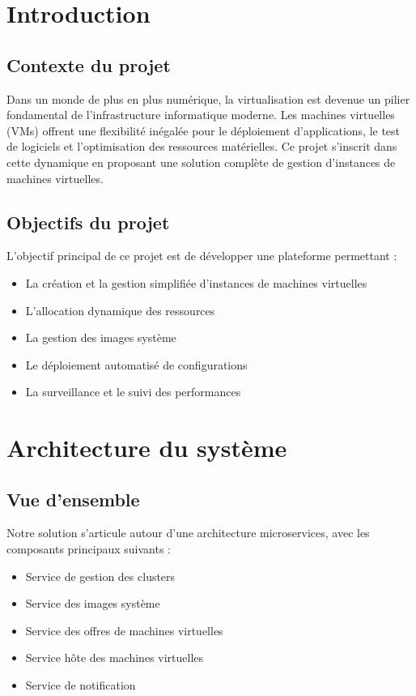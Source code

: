 \documentclass[12pt,a4paper]{report}
\begin{document}
\chapter{Introduction}
\section{Contexte du projet}
Dans un monde de plus en plus numérique, la virtualisation est devenue un pilier fondamental de l'infrastructure informatique moderne. Les machines virtuelles (VMs) offrent une flexibilité inégalée pour le déploiement d'applications, le test de logiciels et l'optimisation des ressources matérielles. Ce projet s'inscrit dans cette dynamique en proposant une solution complète de gestion d'instances de machines virtuelles.

\section{Objectifs du projet}
L'objectif principal de ce projet est de développer une plateforme permettant :
\begin{itemize}
    \item La création et la gestion simplifiée d'instances de machines virtuelles
    \item L'allocation dynamique des ressources
    \item La gestion des images système
    \item Le déploiement automatisé de configurations
    \item La surveillance et le suivi des performances
\end{itemize}

\chapter{Architecture du système}
\section{Vue d'ensemble}
Notre solution s'articule autour d'une architecture microservices, avec les composants principaux suivants :
\begin{itemize}
    \item Service de gestion des clusters
    \item Service des images système
    \item Service des offres de machines virtuelles
    \item Service hôte des machines virtuelles
    \item Service de notification
\end{itemize}
\end{document}
